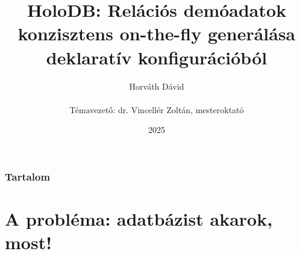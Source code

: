 \documentclass[
    aspectratio=169,
]{beamer}
\title[HoloDB]{HoloDB: Relációs demóadatok konzisztens on-the-fly generálása\\ deklaratív konfigurációból}
\author[Horváth Dávid]{Horváth Dávid \\ ~ \\ { \footnotesize Témavezető: dr. Vincellér Zoltán, mesteroktató }}
\institute[ELTE-IK]{ELTE Informatikai Kar, Információs Rendszerek Tanszék}
\date{2025}
\begin{document}
\beamertemplatenavigationsymbolsempty

\begin{frame}
    \titlepage
\end{frame}

\begin{frame}
    \frametitle{Tartalom}
    \hfill
    \parbox[t]{.95\textwidth}{
        \begin{minipage}[c][0.6\textheight]{\textwidth}
        \tableofcontents
        \end{minipage}
    }
\end{frame}

\section{A probléma: adatbázist akarok, most!}
\def\sectionshorttitle{\arabic{section}. A probléma}
\end{document}
